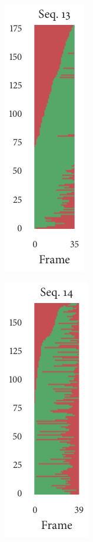 \begin{figure}[b]
\begin{subfigure}[b]{0.2\textwidth}
		\includegraphics{missingness_sequence13.pdf}
	\end{subfigure}%
	\begin{subfigure}[b]{0.2\textwidth}
		\centering
		\includegraphics{missingness_sequence14.pdf}
	\end{subfigure}%
	\begin{subfigure}[b]{0.2\textwidth}
		\centering

\end{subfigure}
\end{figure}
